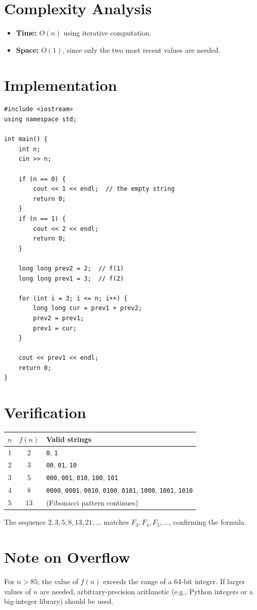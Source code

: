 \documentclass[11pt,a4paper]{article}
\begin{document}
\section{Complexity Analysis}

\begin{itemize}
  \item \textbf{Time:} $O(n)$ using iterative computation.
  \item \textbf{Space:} $O(1)$, since only the two most recent values are
    needed.
\end{itemize}

\section{Implementation}

\begin{lstlisting}
#include <iostream>
using namespace std;

int main() {
    int n;
    cin >> n;

    if (n == 0) {
        cout << 1 << endl;  // the empty string
        return 0;
    }
    if (n == 1) {
        cout << 2 << endl;
        return 0;
    }

    long long prev2 = 2;  // f(1)
    long long prev1 = 3;  // f(2)

    for (int i = 3; i <= n; i++) {
        long long cur = prev1 + prev2;
        prev2 = prev1;
        prev1 = cur;
    }

    cout << prev1 << endl;
    return 0;
}
\end{lstlisting}

\section{Verification}

\begin{center}
\begin{tabular}{|c|c|l|}
\hline
$n$ & $f(n)$ & Valid strings \\
\hline
1 & 2 & \texttt{0}, \texttt{1} \\
2 & 3 & \texttt{00}, \texttt{01}, \texttt{10} \\
3 & 5 & \texttt{000}, \texttt{001}, \texttt{010}, \texttt{100}, \texttt{101} \\
4 & 8 & \texttt{0000}, \texttt{0001}, \texttt{0010}, \texttt{0100},
        \texttt{0101}, \texttt{1000}, \texttt{1001}, \texttt{1010} \\
5 & 13 & (Fibonacci pattern continues) \\
\hline
\end{tabular}
\end{center}

The sequence $2, 3, 5, 8, 13, 21, \ldots$ matches $F_3, F_4, F_5, \ldots$,
confirming the formula.

\section{Note on Overflow}

For $n > 85$, the value of $f(n)$ exceeds the range of a 64-bit integer.
If larger values of $n$ are needed, arbitrary-precision arithmetic (e.g.,
Python integers or a big-integer library) should be used.
\end{document}
